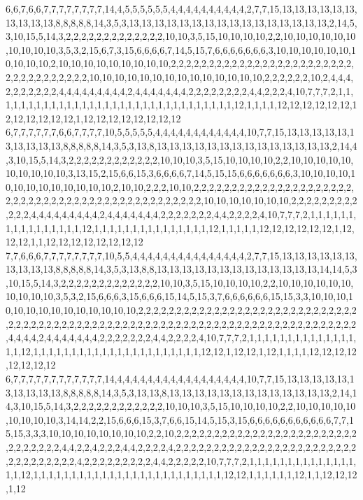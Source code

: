 6,6,7,6,6,7,7,7,7,7,7,7,7,14,4,5,5,5,5,5,5,4,4,4,4,4,4,4,4,4,4,2,7,7,15,13,13,13,13,13,13,13,13,13,13,8,8,8,8,8,14,3,5,3,13,13,13,13,13,13,13,13,13,13,13,13,13,13,13,13,2,14,5,3,10,15,5,14,3,2,2,2,2,2,2,2,2,2,2,2,2,2,10,10,3,5,15,10,10,10,10,2,2,10,10,10,10,10,10,10,10,10,10,3,5,3,2,15,6,7,3,15,6,6,6,6,7,14,5,15,7,6,6,6,6,6,6,6,3,10,10,10,10,10,10,10,10,10,10,2,10,10,10,10,10,10,10,10,10,2,2,2,2,2,2,2,2,2,2,2,2,2,2,2,2,2,2,2,2,2,2,2,2,2,2,2,2,2,2,2,2,2,2,2,10,10,10,10,10,10,10,10,10,10,10,10,10,10,2,2,2,2,2,2,10,2,4,4,4,2,2,2,2,2,2,2,4,4,4,4,4,4,4,4,4,2,4,4,4,4,4,4,4,2,2,2,2,2,2,2,2,4,4,2,2,2,4,10,7,7,7,2,1,1,1,1,1,1,1,1,1,1,1,1,1,1,1,1,1,1,1,1,1,1,1,1,1,1,1,1,1,1,1,1,12,1,1,1,1,12,12,12,12,12,12,12,12,12,12,12,12,1,12,12,12,12,12,12,12,12
6,7,7,7,7,7,7,6,6,7,7,7,7,10,5,5,5,5,5,4,4,4,4,4,4,4,4,4,4,4,4,10,7,7,15,13,13,13,13,13,13,13,13,13,13,8,8,8,8,8,14,3,5,3,13,8,13,13,13,13,13,13,13,13,13,13,13,13,13,13,2,14,4,3,10,15,5,14,3,2,2,2,2,2,2,2,2,2,2,2,2,10,10,10,3,5,15,10,10,10,10,2,2,10,10,10,10,10,10,10,10,10,10,3,13,15,2,15,6,6,15,3,6,6,6,6,7,14,5,15,15,6,6,6,6,6,6,6,3,10,10,10,10,10,10,10,10,10,10,10,10,10,2,10,10,2,2,2,10,10,2,2,2,2,2,2,2,2,2,2,2,2,2,2,2,2,2,2,2,2,2,2,2,2,2,2,2,2,2,2,2,2,2,2,2,2,2,2,2,2,2,2,2,2,2,2,2,10,10,10,10,10,10,10,2,2,2,2,2,2,2,2,2,2,2,2,4,4,4,4,4,4,4,4,4,2,4,4,4,4,4,4,4,2,2,2,2,2,2,2,4,4,2,2,2,2,4,10,7,7,7,2,1,1,1,1,1,1,1,1,1,1,1,1,1,1,1,1,12,1,1,1,1,1,1,1,1,1,1,1,1,1,1,1,12,1,1,1,1,1,12,12,12,12,12,12,1,12,12,12,1,1,12,12,12,12,12,12,12,12
7,7,6,6,6,7,7,7,7,7,7,7,7,10,5,5,4,4,4,4,4,4,4,4,4,4,4,4,4,4,4,2,7,7,15,13,13,13,13,13,13,13,13,13,13,8,8,8,8,8,14,3,5,3,13,8,8,13,13,13,13,13,13,13,13,13,13,13,13,13,14,14,5,3,10,15,5,14,3,2,2,2,2,2,2,2,2,2,2,2,2,2,10,10,3,5,15,10,10,10,10,2,2,10,10,10,10,10,10,10,10,10,10,3,5,3,2,15,6,6,6,3,15,6,6,6,15,14,5,15,3,7,6,6,6,6,6,6,15,15,3,3,10,10,10,10,10,10,10,10,10,10,10,10,10,10,2,2,2,2,2,2,2,2,2,2,2,2,2,2,2,2,2,2,2,2,2,2,2,2,2,2,2,2,2,2,2,2,2,2,2,2,2,2,2,2,2,2,2,2,2,2,2,2,2,2,2,2,2,2,2,2,2,2,2,2,2,2,2,2,2,2,2,2,2,2,2,2,2,2,2,4,4,4,4,2,4,4,4,4,4,4,4,2,2,2,2,2,2,2,4,4,2,2,2,2,4,10,7,7,7,2,1,1,1,1,1,1,1,1,1,1,1,1,1,1,1,1,12,1,1,1,1,1,1,1,1,1,1,1,1,1,1,1,1,1,1,1,1,1,1,12,12,1,12,12,1,12,1,1,1,1,12,12,12,12,12,12,12,12
6,7,7,7,7,7,7,7,7,7,7,7,7,14,4,4,4,4,4,4,4,4,4,4,4,4,4,4,4,4,4,10,7,7,15,13,13,13,13,13,13,13,13,13,13,8,8,8,8,8,14,3,5,3,13,13,8,13,13,13,13,13,13,13,13,13,13,13,13,13,2,14,14,3,10,15,5,14,3,2,2,2,2,2,2,2,2,2,2,2,2,10,10,10,3,5,15,10,10,10,10,2,2,10,10,10,10,10,10,10,10,10,3,14,14,2,2,15,6,6,6,15,3,7,6,6,15,14,5,15,3,15,6,6,6,6,6,6,6,6,6,6,6,7,7,15,15,3,3,3,10,10,10,10,10,10,10,10,2,2,10,2,2,2,2,2,2,2,2,2,2,2,2,2,2,2,2,2,2,2,2,2,2,2,2,2,2,2,2,2,2,2,4,4,2,2,4,2,2,2,4,4,2,2,2,2,4,2,2,2,2,2,2,2,2,2,2,2,2,2,2,2,2,2,2,2,2,2,2,2,2,2,2,2,2,2,2,2,2,2,4,2,2,2,2,2,2,2,2,2,4,4,2,2,2,2,2,10,7,7,7,2,1,1,1,1,1,1,1,1,1,1,1,1,1,1,1,1,12,1,1,1,1,1,1,1,1,1,1,1,1,1,1,1,1,1,1,1,1,1,1,1,1,1,12,12,1,1,1,1,1,1,12,1,1,12,12,12,1,12

